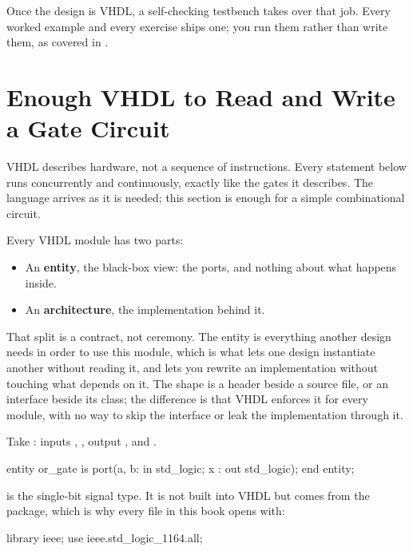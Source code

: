 Once the design is VHDL, a self-checking testbench takes over that job. Every worked example and
every exercise ships one; you run them rather than write them, as covered in .

\section{Enough VHDL to Read and Write a Gate Circuit}
\label{c1:a4}
VHDL describes hardware, not a sequence of instructions. Every statement below runs concurrently
and continuously, exactly like the gates it describes. The language arrives as it is needed; this
section is enough for a simple combinational circuit.

Every VHDL module has two parts:
\begin{itemize}
  \item An \textbf{entity}, the black-box view: the ports, and nothing about what happens inside.
  \item An \textbf{architecture}, the implementation behind it.
\end{itemize}
That split is a contract, not ceremony. The entity is everything another design needs in order to
use this module, which is what lets one design instantiate another without reading it, and lets
you rewrite an implementation without touching what depends on it. The shape is a header beside a
source file, or an interface beside its class; the difference is that VHDL enforces it for every
module, with no way to skip the interface or leak the implementation through it.

Take : inputs , , output , and .

\begin{vhdlcode}
entity or_gate is
    port(a, b: in std_logic;
         x   : out std_logic);
end entity;
\end{vhdlcode}


\noindent{} is the single-bit signal type. It is not built into VHDL but comes from
the  package, which is why every file in this book opens with:

\begin{vhdlcode}
library ieee;
use ieee.std_logic_1164.all;
\end{vhdlcode}

